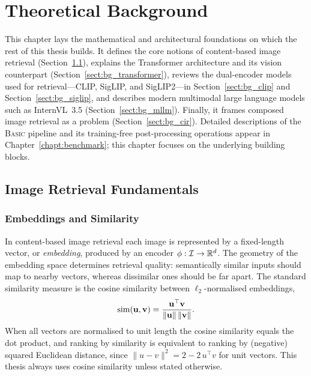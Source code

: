 \chapter{Theoretical Background}\label{chapt:background}


This chapter lays the mathematical and architectural foundations on which the
rest of this thesis builds. It defines the core notions of content-based image
retrieval (Section~\ref{sect:bg_retrieval}), explains the Transformer
architecture and its vision counterpart (Section~\ref{sect:bg_transformer}),
reviews the dual-encoder models used for retrieval---CLIP, SigLIP, and
SigLIP2---in Section~\ref{sect:bg_clip} and Section~\ref{sect:bg_siglip}, and
describes modern multimodal large language models such as InternVL~3.5
(Section~\ref{sect:bg_mllm}). Finally, it frames composed image retrieval as a
problem (Section~\ref{sect:bg_cir}). Detailed descriptions of the
\textsc{Basic} pipeline and its training-free post-processing operations
appear in Chapter~\ref{chapt:benchmark}; this chapter focuses on the
underlying building blocks.

\section{Image Retrieval Fundamentals}\label{sect:bg_retrieval}

\subsection{Embeddings and Similarity}

In content-based image retrieval each image is represented by a fixed-length
vector, or \emph{embedding}, produced by an encoder $\phi:\mathcal{I}\to
\mathbb{R}^{d}$. The geometry of the embedding space determines retrieval
quality: semantically similar inputs should map to nearby vectors, whereas
dissimilar ones should be far apart. The standard similarity measure is the
cosine similarity between $\ell_2$-normalised embeddings,
\begin{equation}\label{eq:cosine}
  \mathrm{sim}(\mathbf{u},\mathbf{v})
  = \frac{\mathbf{u}^{\top}\mathbf{v}}
         {\lVert\mathbf{u}\rVert\,\lVert\mathbf{v}\rVert}.
\end{equation}
When all vectors are normalised to unit length the cosine similarity equals the
dot product, and ranking by similarity is equivalent to ranking by (negative)
squared Euclidean distance, since $\lVert u-v\rVert^{2}=2-2\,u^{\top}v$ for
unit vectors. This thesis always uses cosine similarity unless stated otherwise.

